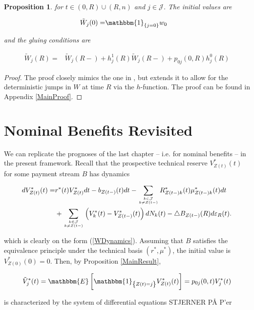 \documentclass{book}
\newcommand{\1}[1]{\mathbbm{1}_{\left\lbrace #1 \right\rbrace}}
\newcommand{\expec}[1][def]{\mathbbm{E} \left[ #1 \right]}
\theoremstyle{break}
\newtheorem{proposition}[definition]{Proposition}%
\theoremstyle{remark}
\numberwithin{equation}{section}
\begin{document}
\begin{proposition}
	for $t \in (0,R)\cup(R,n)$ and $j \in \mathcal{J}$. The initial values are
	
	\begin{align*}
	\tilde{W}_j(0) =& \1{j=0} w_0
	\end{align*}
	
	and the gluing conditions are
	
	\begin{align*}
	\tilde{W}_j(R) =& \tilde{W}_j(R-) + h_j^1(R) \tilde{W}_j(R-) + p_{0j}(0,R) h_j^0(R)
	\end{align*}
	
\end{proposition}
\begin{proof}
	The proof closely mimics the one in \cite{Lollike}, but extends it to allow for the deterministic jumps in $W$ at time $R$ via the $h$-function. The proof can be found in Appendix \ref{MainProof}.
\end{proof}

\section{Nominal Benefits Revisited}

We can replicate the prognoses of the last chapter -- i.e. for nominal benefits -- in the present framework. Recall that the prospective technical reserve $V_{Z(t)}^*(t)$ for some payment stream $B$ has dynamics

\begin{align*}
		dV_{Z(t)}^*(t) =& r^*(t) V_{Z(t)}^* dt - b_{Z(t-)}(t) dt - \sum_{k \in \mathcal{J} \atop k \neq Z(t-)} R_{Z(t-)k}^*(t) \mu_{Z(t-)k}^*(t) dt \\
		&+ \sum_{k \in \mathcal{J} \atop k \neq Z(t-)} \left( V_k^*(t) - V_{Z(t-)}^*(t) \right) dN_k(t) - \triangle B_{Z(t-)}(R) d\varepsilon_{R}(t).
\end{align*}

which is clearly on the form (\ref{WDynamics}). Assuming that $B$ satisfies the equivalence principle under the technical basis $(r^*,\mu^*)$, the initial value is $V_{Z(0)}^*(0)=0$. Then, by Proposition \ref{MainResult},

\begin{align*}
\tilde{V}_j^*(t) = \expec[\1{Z(t)=j} V_{Z(t)}^*(t)] = p_{0j}(0,t) V_j^*(t)
\end{align*}

is characterized by the system of differential equations STJERNER PÅ P'er
\end{document}
